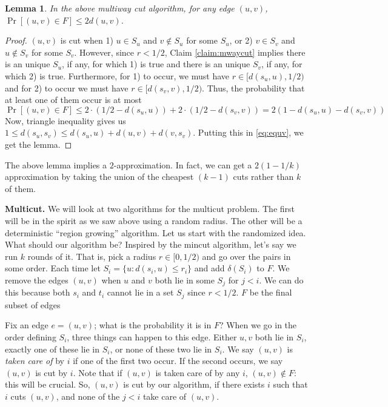 \documentclass[11pt]{article}
\newtheorem{lemma}{Lemma}
\begin{document}
\begin{lemma}
In the above multiway cut algorithm, for any edge $(u,v)$, $\Pr[(u,v) \in F] \le 2d(u,v)$.
\end{lemma}
\begin{proof}
$(u,v)$ is cut when 1) $u \in S_u$ and $v\notin S_u$ for some $S_u$, or 2) $v\in S_v$ and $u\notin S_v$ for some $S_v$. However, since $r < 1/2$, Claim \ref{claim:mwaycut} implies there is an unique $S_u$, if any, for which 1) is true and there is an
unique $S_v$, if any, for which 2) is true. 
Furthermore, for 1) to occur, we must have $r\in [d(s_u,u),1/2)$ and for 2) to occur we must have $r\in [d(s_v,v),1/2)$.
Thus, the probability that at least one of them occur is at most 
\begin{equation}\label{eq:equv}
\Pr[(u,v)\in F] \le 2\cdot (1/2 - d(s_u,u)) + 2\cdot (1/2 - d(s_v,v)) = 2\left(1 - d(s_u,u) - d(s_v,v)\right)
\end{equation}
Now, triangle inequality gives us $1 \le d(s_u,s_v) \le d(s_u,u) + d(u,v) + d(v,s_v)$. Putting this in \eqref{eq:equv},
we get the lemma.
\end{proof}
\noindent
The above lemma implies a $2$-approximation. In fact, we can get a $2(1-1/k)$ approximation by taking the union of the cheapest 
$(k-1)$ cuts rather than $k$ of them.\\
\def\Ev{{\mathcal E}}


\noindent 
{\bf Multicut.}
We will look at two algorithms for the multicut problem. The first will be in the spirit as we saw above
using a random radius. The other will be a deterministic ``region growing'' algorithm.
Let us start with the randomized idea. What should our algorithm be? 
Inspired by the mincut algorithm, let's say we run $k$ rounds of it. That is, pick a radius $r\in [0,1/2)$ 
and go over the pairs in some order. Each time let $S_i = \{u:d(s_i,u) \le r_i\}$ and add $\delta(S_i)$ to $F$.
We remove the edges $(u,v)$ when $u$ and $v$ both lie in some $S_j$ for $j< i$. 
We can do this because both $s_i$ and $t_i$ cannot lie in a set $S_j$ since $r < 1/2$.
$F$ be the final subset of edges
\medskip

\noindent
Fix an edge $e = (u,v)$; what is the probability it is in $F$? 
When we go in the order defining $S_i$, three things can happen to this edge. Either 
$u,v$ both lie in $S_i$, exactly one of these lie in $S_i$, or none of these two lie in $S_i$. 
We say $(u,v)$ is {\em taken care of} by $i$ if one of the first two occur. If the second occurs, 
we say $(u,v)$ is cut by $i$. Note that if $(u,v)$ is taken care of by any $i$, $(u,v)\notin F$: this will be crucial. 
So, $(u,v)$ is cut by our algorithm, if there exists $i$ such that $i$ cuts $(u,v)$, and none of the $j< i$ take care of $(u,v)$. 
\medskip
\end{document}
